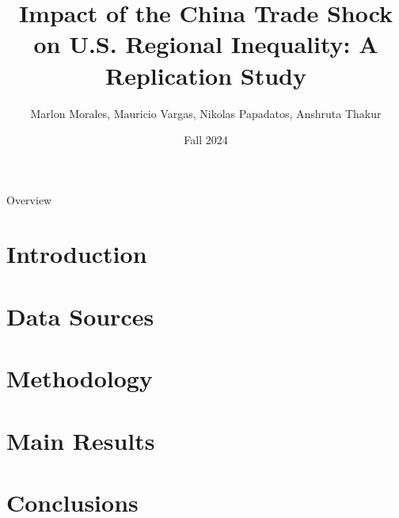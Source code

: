 \documentclass[8pt]{beamer}
\title{Impact of the China Trade Shock on U.S. Regional Inequality: A Replication Study}
\date{Fall 2024}
\author{
    Marlon Morales, Mauricio Vargas, Nikolas Papadatos, Anshruta Thakur
}
\begin{document}
\insertTitleSlide

\begin{frame}{Overview}
    \tableofcontents
\end{frame}


\section{Introduction}
    

\section{Data Sources}
    
\section{Methodology}
    

\section{Main Results}
    

\section{Conclusions}
    

\insertLastSlide
\end{document}
